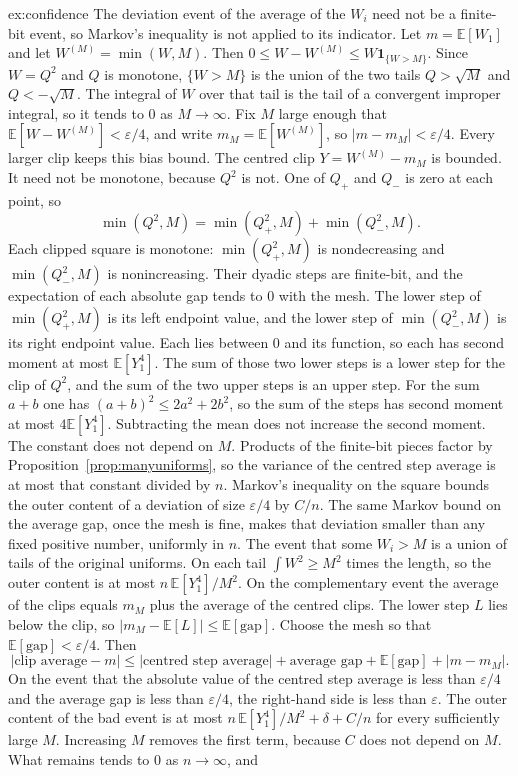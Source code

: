 \begin{solution}{ex:confidence}
The deviation event of the average of the $W_i$ need not be a finite-bit event, so Markov's inequality is not applied to its indicator. Let $m=\mathbb E[W_1]$ and let $W^{(M)}=\min(W,M)$. Then $0\le W-W^{(M)}\le W\mathbf 1_{\{W>M\}}$. Since $W=Q^2$ and $Q$ is monotone, $\{W>M\}$ is the union of the two tails $Q>\sqrt M$ and $Q<-\sqrt M$. The integral of $W$ over that tail is the tail of a convergent improper integral, so it tends to $0$ as $M\to\infty$. Fix $M$ large enough that $\mathbb E[W-W^{(M)}]<\varepsilon/4$, and write $m_M=\mathbb E[W^{(M)}]$, so $|m-m_M|<\varepsilon/4$. Every larger clip keeps this bias bound. The centred clip $Y=W^{(M)}-m_M$ is bounded. It need not be monotone, because $Q^2$ is not. One of $Q_+$ and $Q_-$ is zero at each point, so
\[
 \min(Q^2,M)=\min(Q_+^2,M)+\min(Q_-^2,M).
\]
Each clipped square is monotone: $\min(Q_+^2,M)$ is nondecreasing and $\min(Q_-^2,M)$ is nonincreasing. Their dyadic steps are finite-bit, and the expectation of each absolute gap tends to $0$ with the mesh. The lower step of $\min(Q_+^2,M)$ is its left endpoint value, and the lower step of $\min(Q_-^2,M)$ is its right endpoint value. Each lies between $0$ and its function, so each has second moment at most $\mathbb E[Y_1^4]$. The sum of those two lower steps is a lower step for the clip of $Q^2$, and the sum of the two upper steps is an upper step. For the sum $a+b$ one has $(a+b)^2\le 2a^2+2b^2$, so the sum of the steps has second moment at most $4\mathbb E[Y_1^4]$. Subtracting the mean does not increase the second moment. The constant does not depend on $M$. Products of the finite-bit pieces factor by Proposition~\ref{prop:manyuniforms}, so the variance of the centred step average is at most that constant divided by $n$. Markov's inequality on the square bounds the outer content of a deviation of size $\varepsilon/4$ by $C/n$. The same Markov bound on the average gap, once the mesh is fine, makes that deviation smaller than any fixed positive number, uniformly in $n$. The event that some $W_i>M$ is a union of tails of the original uniforms. On each tail $\int W^2\ge M^2$ times the length, so the outer content is at most $n\,\mathbb E[Y_1^4]/M^2$. On the complementary event the average of the clips equals $m_M$ plus the average of the centred clips. The lower step $L$ lies below the clip, so $|m_M-\mathbb E[L]|\le\mathbb E[\mathrm{gap}]$. Choose the mesh so that $\mathbb E[\mathrm{gap}]<\varepsilon/4$. Then
\[
 |\text{clip average}-m|
 \le|\text{centred step average}|+\text{average gap}+\mathbb E[\mathrm{gap}]+|m-m_M|.
\]
On the event that the absolute value of the centred step average is less than $\varepsilon/4$ and the average gap is less than $\varepsilon/4$, the right-hand side is less than $\varepsilon$. The outer content of the bad event is at most $n\,\mathbb E[Y_1^4]/M^2+\delta+C/n$ for every sufficiently large $M$. Increasing $M$ removes the first term, because $C$ does not depend on $M$. What remains tends to $0$ as $n\to\infty$, and

\end{solution}
